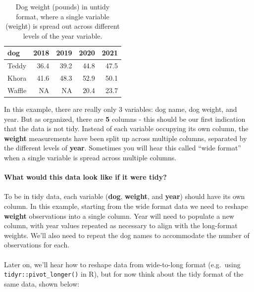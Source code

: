 \documentclass[
]{book}
\begin{document}
\begin{table}

\caption{\label{tab:unnamed-chunk-3}Dog weight (pounds) in untidy format, where a single variable (weight) is spread out across different levels of the year variable.}
\centering
\begin{tabular}[t]{l|r|r|r|r}
\hline
dog & 2018 & 2019 & 2020 & 2021\\
\hline
Teddy & 36.4 & 39.2 & 44.8 & 47.5\\
\hline
Khora & 41.6 & 48.3 & 52.9 & 50.1\\
\hline
Waffle & NA & NA & 20.4 & 23.7\\
\hline
\end{tabular}
\end{table}

In this example, there are really only 3 variables: dog name, dog weight, and year. But as organized, there are \textbf{5} columns - this should be our first indication that the data is not tidy. Instead of each variable occupying its own column, the \textbf{weight} measurements have been split up across multiple columns, separated by the different levels of \textbf{year}. Sometimes you will hear this called ``wide format'' when a single variable is spread across multiple columns.\\
~\\
\textbf{What would this data look like if it were tidy?}\\
~\\
To be in tidy data, each variable (\textbf{dog}, \textbf{weight}, and \textbf{year}) should have its own column. In this example, starting from the wide format data we need to reshape \textbf{weight} observations into a single column. Year will need to populate a new column, with year values repeated as necessary to align with the long-format weights. We'll also need to repeat the dog names to accommodate the number of observations for each.\\
~\\
Later on, we'll hear how to reshape data from wide-to-long format (e.g.~using \texttt{tidyr::pivot\_longer()} in R), but for now think about the tidy format of the same data, shown below:
\end{document}
